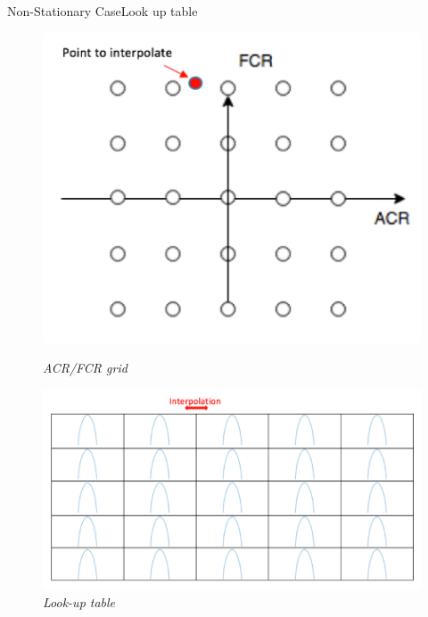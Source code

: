 \documentclass{bredelebeamer}
\begin{document}
\begin{frame}{Non-Stationary Case}{Look up table}
\begin{figure}
   \begin{minipage}[c]{.46\linewidth}
      \includegraphics[scale=0.3]{grid.png}
      \caption{\it ACR/FCR grid}
   \end{minipage} \hfill
   \begin{minipage}[c]{.46\linewidth}
      \includegraphics[scale=0.35]{LUT.png}
      \caption{\it Look-up table}
   \end{minipage}
\end{figure}

\end{frame}
\end{document}
